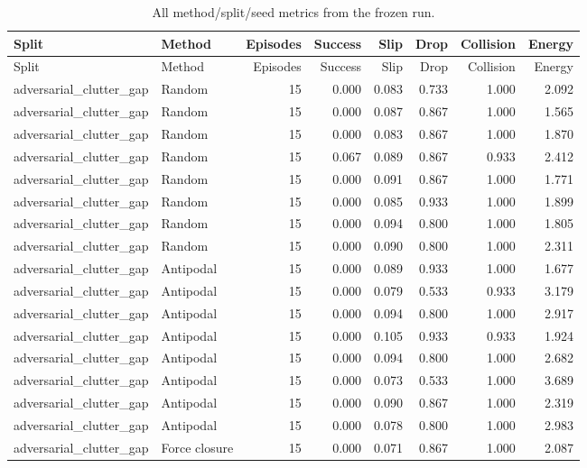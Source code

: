 {\scriptsize
\setlength{\tabcolsep}{2.5pt}
\begin{longtable}{llrrrrrr}
\caption{All method/split/seed metrics from the frozen run.}\label{tab:all-seed-metrics}\\
\toprule
Split & Method & Episodes & Success & Slip & Drop & Collision & Energy \\
\midrule
\endfirsthead
\toprule
Split & Method & Episodes & Success & Slip & Drop & Collision & Energy \\
\midrule
\endhead
adversarial\_clutter\_gap & Random & 15 & 0.000 & 0.083 & 0.733 & 1.000 & 2.092 \\
adversarial\_clutter\_gap & Random & 15 & 0.000 & 0.087 & 0.867 & 1.000 & 1.565 \\
adversarial\_clutter\_gap & Random & 15 & 0.000 & 0.083 & 0.867 & 1.000 & 1.870 \\
adversarial\_clutter\_gap & Random & 15 & 0.067 & 0.089 & 0.867 & 0.933 & 2.412 \\
adversarial\_clutter\_gap & Random & 15 & 0.000 & 0.091 & 0.867 & 1.000 & 1.771 \\
adversarial\_clutter\_gap & Random & 15 & 0.000 & 0.085 & 0.933 & 1.000 & 1.899 \\
adversarial\_clutter\_gap & Random & 15 & 0.000 & 0.094 & 0.800 & 1.000 & 1.805 \\
adversarial\_clutter\_gap & Random & 15 & 0.000 & 0.090 & 0.800 & 1.000 & 2.311 \\
adversarial\_clutter\_gap & Antipodal & 15 & 0.000 & 0.089 & 0.933 & 1.000 & 1.677 \\
adversarial\_clutter\_gap & Antipodal & 15 & 0.000 & 0.079 & 0.533 & 0.933 & 3.179 \\
adversarial\_clutter\_gap & Antipodal & 15 & 0.000 & 0.094 & 0.800 & 1.000 & 2.917 \\
adversarial\_clutter\_gap & Antipodal & 15 & 0.000 & 0.105 & 0.933 & 0.933 & 1.924 \\
adversarial\_clutter\_gap & Antipodal & 15 & 0.000 & 0.094 & 0.800 & 1.000 & 2.682 \\
adversarial\_clutter\_gap & Antipodal & 15 & 0.000 & 0.073 & 0.533 & 1.000 & 3.689 \\
adversarial\_clutter\_gap & Antipodal & 15 & 0.000 & 0.090 & 0.867 & 1.000 & 2.319 \\
adversarial\_clutter\_gap & Antipodal & 15 & 0.000 & 0.078 & 0.800 & 1.000 & 2.983 \\
adversarial\_clutter\_gap & Force closure & 15 & 0.000 & 0.071 & 0.867 & 1.000 & 2.087 \\

\end{longtable}}
